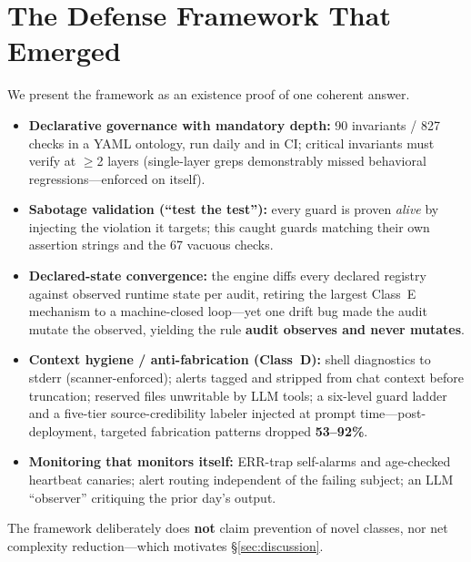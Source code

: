 \documentclass[conference]{IEEEtran}
\begin{document}
\section{The Defense Framework That Emerged}\label{sec:defense}
We present the framework as an existence proof of one coherent answer.
\begin{itemize}\setlength\itemsep{1pt}
\item \textbf{Declarative governance with mandatory depth:} 90 invariants
/ 827 checks in a YAML ontology, run daily and in CI; critical invariants
must verify at $\geq$2 layers (single-layer greps demonstrably missed
behavioral regressions---enforced on itself).
\item \textbf{Sabotage validation (``test the test''):} every guard is
proven \emph{alive} by injecting the violation it targets; this caught
guards matching their own assertion strings and the 67 vacuous checks.
\item \textbf{Declared-state convergence:} the engine diffs every declared
registry against observed runtime state per audit, retiring the largest
Class~E mechanism to a machine-closed loop---yet one drift bug made the
audit mutate the observed, yielding the rule \textbf{audit observes and
never mutates}.
\item \textbf{Context hygiene / anti-fabrication (Class~D):} shell
diagnostics to stderr (scanner-enforced); alerts tagged and stripped from
chat context before truncation; reserved files unwritable by LLM tools; a
six-level guard ladder and a five-tier source-credibility labeler injected
at prompt time---post-deployment, targeted fabrication patterns dropped
\textbf{53--92\%}.
\item \textbf{Monitoring that monitors itself:} ERR-trap self-alarms and
age-checked heartbeat canaries; alert routing independent of the failing
subject; an LLM ``observer'' critiquing the prior day's output.
\end{itemize}
The framework deliberately does \textbf{not} claim prevention of novel
classes, nor net complexity reduction---which motivates
\S\ref{sec:discussion}.
\end{document}

